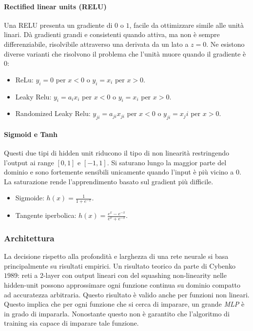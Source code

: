 			\paragraph{Rectified linear units (RELU)}
			Una RELU presenta un gradiente di $0$ o $1$, facile da ottimizzare simile alle unit\`a linari.
			D\`a gradienti grandi e consistenti quando attiva, ma non \`e sempre differenziabile, risolvibile attraverso una derivata da un lato a $z=0$.
			Ne esistono diverse varianti che risolvono il problema che l'unit\`a muore quando il gradiente \`e $0$:
			\begin{multicols}{2}
				\begin{itemize}
					\item ReLu: $y_i = 0$ per $x < 0$ o $y_i = x_i$ per $x >0$.
					\item Leaky Relu: $y_i = a_ix_i$ per $x < 0$ o $y_i = x_i$ per $x >0$.
					\item Randomized Leaky Relu: $y_{ji} = a_{ji}x_{ji}$ per $x < 0$ o $y_{ji} = x_{j}i$ per $x >0$.
				\end{itemize}
			\end{multicols}

			\paragraph{Sigmoid e Tanh}
			Questi due tipi di hidden unit riducono il tipo di non linearit\`a restringendo l'output ai range $[0,1]$ e $[-1,1]$.
			Si saturano lungo la maggior parte del dominio e sono fortemente sensibili unicamente quando l'input \`e pi\`u vicino a $0$.
			La saturazione rende l'apprendimento basato sul gradient pi\`u difficile.
			\begin{multicols}{2}
				\begin{itemize}
					\item Sigmoide: $h(x) = \frac{1}{1+e^{-x}}$.
					\item Tangente iperbolica: $h(x) = \frac{e^x-e^{-x}}{e^x+e^{-x}}$.
				\end{itemize}
			\end{multicols}

		\subsubsection{Architettura}
		La decisione rispetto alla profondit\`a e larghezza di una rete neurale si basa principalmente su risultati empirici.
		Un risultato teorico da parte di Cybenko $1989$: reti a $2$-layer con output lineari con del squashing non-linearity nelle hidden-unit possono approssimare ogni funzione continua su dominio compatto ad accuratezza arbitraria.
		Questo risultato \`e valido anche per funzioni non lineari.
		Questo implica che per ogni funzione che si cerca di imparare, un grande \emph{MLP} \`e in grado di impararla.
		Nonostante questo non \`e garantito che l'algoritmo di training sia capace di imparare tale funzione.

